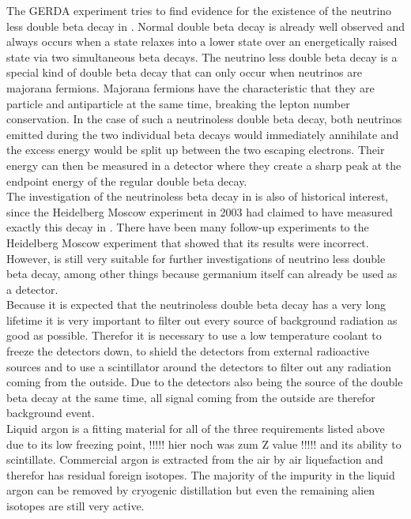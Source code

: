 The GERDA experiment tries to find evidence for the existence of the neutrino less double beta decay in .
Normal double beta decay is already well observed and always occurs when a state relaxes into a lower state over an energetically raised state via two simultaneous beta decays.
The neutrino less double beta decay is a special kind of double beta decay that can only occur when neutrinos are majorana fermions.
Majorana fermions have the characteristic that they are particle and antiparticle at the same time, breaking the lepton number conservation.
In the case of such a neutrinoless double beta decay, both neutrinos emitted during the two individual beta decays would immediately annihilate and the excess energy would be split up between the two escaping electrons.
Their energy can then be measured in a detector where they create a sharp peak at the endpoint energy of the regular double beta decay.
\\

The investigation of the neutrinoless beta decay in \Ge is also of historical interest, since the Heidelberg Moscow experiment in 2003 had claimed to have measured exactly this decay in \Ge.
There have been many follow-up experiments to the Heidelberg Moscow experiment that showed that its results were incorrect.
However, \Ge is still very suitable for further investigations of neutrino less double beta decay, among other things because germanium itself can already be used as a detector.
\\

Because it is expected that the neutrinoless double beta decay has a very long lifetime it is very important to filter out every source of background radiation as good as possible. 
Therefor it is necessary to use a low temperature coolant to freeze the  detectors down, to shield the detectors from external radioactive sources and to use a scintillator around the detectors to filter out any radiation coming from the outside. 
Due to the \Ge detectors also being the source of the double beta decay at the same time, all signal coming from the outside are therefor background event. 
\\

Liquid argon is a fitting material for all of the three requirements listed above due to its low freezing point, !!!!! hier noch was zum Z value !!!!! and its ability to scintillate. 
Commercial argon is extracted from the air by air liquefaction and therefor has residual foreign isotopes. 
The majority of the impurity in the liquid argon can be removed by cryogenic distillation but even the remaining alien isotopes are still very active.\\

